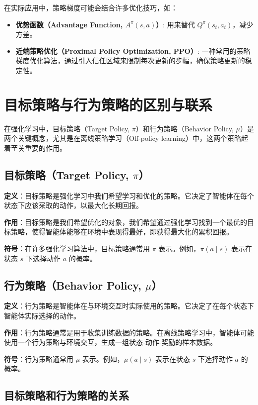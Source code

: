 \documentclass[twocolumn, 10pt]{article} %
\theoremstyle{remark}
\begin{document}
在实际应用中，策略梯度可能会结合许多优化技巧，如：
\begin{itemize}
    \item \textbf{优势函数（Advantage Function, \( A^\pi(s, a) \)）}: 用来替代 \( Q^\pi(s_t, a_t) \)，减少方差。
    \item \textbf{近端策略优化（Proximal Policy Optimization, PPO）}: 一种常用的策略梯度优化算法，通过引入信任区域来限制每次更新的步幅，确保策略更新的稳定性。
\end{itemize}


\section{目标策略与行为策略的区别与联系}

在强化学习中，目标策略（Target Policy, \(\pi\)）和行为策略（Behavior Policy, \(\mu\)）是两个关键概念，尤其是在离线策略学习（Off-policy learning）中，这两个策略起着至关重要的作用。

\subsection{目标策略（Target Policy, \(\pi\)）}

\textbf{定义}：目标策略是强化学习中我们希望学习和优化的策略。它决定了智能体在每个状态下应该采取的动作，以最大化长期回报。

\textbf{作用}：目标策略是我们希望优化的对象，我们希望通过强化学习找到一个最优的目标策略，使得智能体能够在环境中表现得最好，即获得最大化的累积回报。

\textbf{符号}：在许多强化学习算法中，目标策略通常用 \(\pi\) 表示。例如，\(\pi(a \mid s)\) 表示在状态 \(s\) 下选择动作 \(a\) 的概率。

\subsection{行为策略（Behavior Policy, \(\mu\)）}

\textbf{定义}：行为策略是智能体在与环境交互时实际使用的策略。它决定了在每个状态下智能体实际选择的动作。

\textbf{作用}：行为策略通常是用于收集训练数据的策略。在离线策略学习中，智能体可能使用一个行为策略与环境交互，生成一组状态-动作-奖励的样本数据。

\textbf{符号}：行为策略通常用 \(\mu\) 表示。例如，\(\mu(a \mid s)\) 表示在状态 \(s\) 下选择动作 \(a\) 的概率。

\subsection{目标策略和行为策略的关系}
\end{document}
